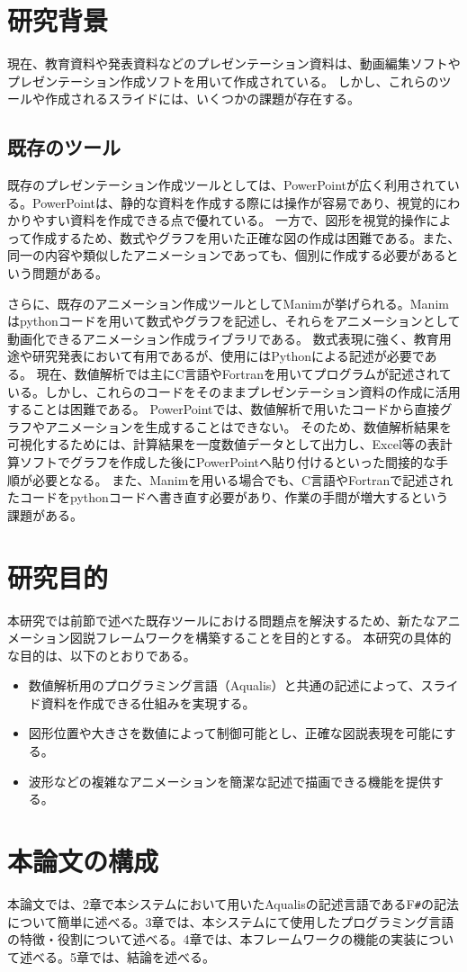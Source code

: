 \section{研究背景}
現在、教育資料や発表資料などのプレゼンテーション資料は、動画編集ソフトやプレゼンテーション作成ソフトを用いて作成されている。
しかし、これらのツールや作成されるスライドには、いくつかの課題が存在する。
\subsection{既存のツール}
既存のプレゼンテーション作成ツールとしては、PowerPoint\cite{Microsoft}が広く利用されている。PowerPointは、静的な資料を作成する際には操作が容易であり、視覚的にわかりやすい資料を作成できる点で優れている。
一方で、図形を視覚的操作によって作成するため、数式やグラフを用いた正確な図の作成は困難である。また、同一の内容や類似したアニメーションであっても、個別に作成する必要があるという問題がある。
\par
さらに、既存のアニメーション作成ツールとしてManim\cite{Manim}が挙げられる。Manimはpythonコードを用いて数式やグラフを記述し、それらをアニメーションとして動画化できるアニメーション作成ライブラリである。
数式表現に強く、教育用途や研究発表において有用であるが、使用にはPythonによる記述が必要である。
現在、数値解析では主にC言語やFortranを用いてプログラムが記述されている。しかし、これらのコードをそのままプレゼンテーション資料の作成に活用することは困難である。
PowerPointでは、数値解析で用いたコードから直接グラフやアニメーションを生成することはできない。
そのため、数値解析結果を可視化するためには、計算結果を一度数値データとして出力し、Excel等の表計算ソフトでグラフを作成した後にPowerPointへ貼り付けるといった間接的な手順が必要となる。
また、Manimを用いる場合でも、C言語やFortranで記述されたコードをpythonコードへ書き直す必要があり、作業の手間が増大するという課題がある。

\section{研究目的}
本研究では前節で述べた既存ツールにおける問題点を解決するため、新たなアニメーション図説フレームワークを構築することを目的とする。
本研究の具体的な目的は、以下のとおりである。
  \begin{itemize}
    \item 数値解析用のプログラミング言語（Aqualis）\cite{sugisakaAqualis}と共通の記述によって、スライド資料を作成できる仕組みを実現する。
    \item 図形位置や大きさを数値によって制御可能とし、正確な図説表現を可能にする。
    \item 波形などの複雑なアニメーションを簡潔な記述で描画できる機能を提供する。
\end{itemize}
\section{本論文の構成}
本論文では、2章で本システムにおいて用いたAqualisの記述言語であるF\texttt{\#}の記法について簡単に述べる。3章では、本システムにて使用したプログラミング言語の特徴・役割について述べる。4章では、本フレームワークの機能の実装について述べる。5章では、結論を述べる。